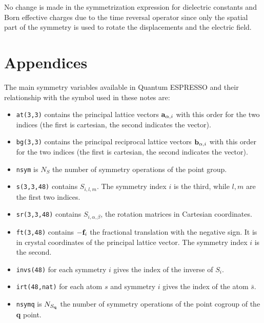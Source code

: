\documentclass[12pt,a4paper,twoside]{report}
\begin{document}
No change is made in the symmetrization expression for dielectric constants and Born effective charges due to the
time reversal operator since only the spatial part of the symmetry is used to rotate the displacements and the electric field. 

\newpage
{\color{dark-blue}\chapter{Appendices}}
\color{black}
The main symmetry variables available in Quantum ESPRESSO and their relationship with the symbol used in these notes are:

\begin{itemize}

\item
\texttt{at(3,3)} contains the principal lattice vectors ${\bf a}_{\alpha,i}$ with this order for the two indices (the first is cartesian, the second indicates the vector). 

\item
\texttt{bg(3,3)} contains the principal reciprocal lattice vectors ${\bf b}_{\alpha,i}$ with this order for the two indices (the first is cartesian, the second indicates the vector).

\item 
\texttt{nsym} is $N_S$ the number of symmetry operations of the point group.

\item
\texttt{s(3,3,48)} contains $S_{i,l,m}$. The symmetry index $i$ is the third, while $l,m$ are the first two indices.

\item
\texttt{sr(3,3,48)} contains $S_{i,\alpha,\beta}$, the rotation matrices in Cartesian coordinates.

\item
\texttt{ft(3,48)} contains $-{\bf f}_i$ the fractional translation with the negative sign.
It is in crystal coordinates of the principal lattice vector. The symmetry index $i$ is the second.

\item
\texttt{invs(48)} for each symmetry $i$ gives the index of the inverse of $S_i$.

\item
\texttt{irt(48,nat)} for each atom $s$ and symmetry $i$ gives the index of the atom $\bar s$.

\item 
\texttt{nsymq} is $N_{S_{\bf q}}$ the number of symmetry operations of the point cogroup of the
{\bf q} point.


\end{itemize}
\end{document}

